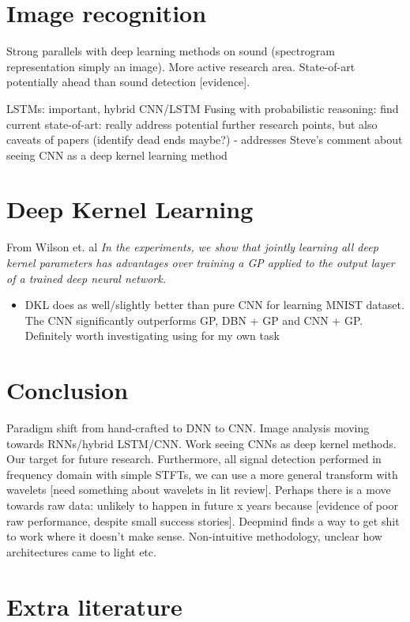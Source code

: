 \documentclass[12pt]{llncs}
\begin{document}
\section{Image recognition}
Strong parallels with deep learning methods on sound (spectrogram representation simply an image). More active research area. State-of-art potentially ahead than sound detection [evidence].

LSTMs: important, hybrid CNN/LSTM
Fusing with probabilistic reasoning: find current state-of-art: really address potential further research points, but also caveats of papers (identify dead ends maybe?)
- addresses Steve's comment about seeing CNN as a deep kernel learning method


\section{Deep Kernel Learning}

From Wilson et. al \cite{wilson2016deep}
\emph{In the experiments, we show that jointly learning all deep kernel parameters has advantages over training a GP applied to the output layer of a trained deep neural network.}

\begin{itemize}
	\item DKL does as well/slightly better than pure CNN for learning MNIST dataset. The CNN significantly outperforms GP, DBN + GP and CNN + GP. Definitely worth investigating using for my own task
\end{itemize}


\section{Conclusion}
Paradigm shift from hand-crafted to DNN to CNN. Image analysis moving towards RNNs/hybrid LSTM/CNN. Work seeing CNNs as deep kernel methods. Our target for future research. Furthermore, all signal detection performed in frequency domain with simple STFTs, we can use a more general transform with wavelets [need something about wavelets in lit review]. Perhaps there is a move towards raw data: unlikely to happen in future x years because [evidence of poor raw performance, despite small success stories]. Deepmind finds a way to get shit to work where it doesn't make sense. Non-intuitive methodology, unclear how architectures came to light etc.


\section{Extra literature}
\cite{mcvicar2016learning}
\end{document}
